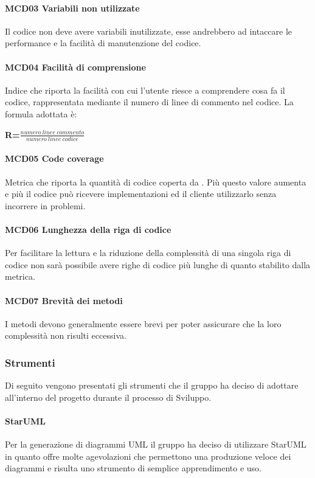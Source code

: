 \paragraph{MCD03 Variabili non utilizzate}
Il codice non deve avere variabili inutilizzate, esse andrebbero ad intaccare le performance e la facilità di manutenzione del codice.
\paragraph{MCD04 Facilità di comprensione}
Indice che riporta la facilità con cui l'utente riesce a comprendere cosa fa il codice, rappresentata mediante il numero di linee di commento nel codice.
La formula adottata è:\newline
\centerline{\textbf{R=$\frac{numero\ linee\ commento}{numero\ linee\ codice}$}}
\paragraph{MCD05 Code coverage}
Metrica che riporta la quantità di codice coperta da . Più questo valore aumenta e più il codice può ricevere implementazioni ed il cliente utilizzarlo senza incorrere in problemi.
\paragraph{MCD06 Lunghezza della riga di codice}
Per facilitare la lettura e la riduzione della complessità di una singola riga di codice non sarà possibile avere righe di codice più lunghe di quanto stabilito dalla metrica.
\paragraph{MCD07 Brevità dei metodi}
I metodi devono generalmente essere brevi per poter assicurare che la loro complessità non risulti eccessiva.

\subsubsection{Strumenti}
Di seguito vengono presentati gli strumenti che il gruppo ha deciso di adottare all'interno del progetto durante il processo di Sviluppo.
\paragraph{StarUML}
Per la generazione di diagrammi UML il gruppo ha deciso di utilizzare StarUML in quanto offre molte agevolazioni che permettono una produzione veloce dei diagrammi e risulta uno strumento di semplice apprendimento e uso.